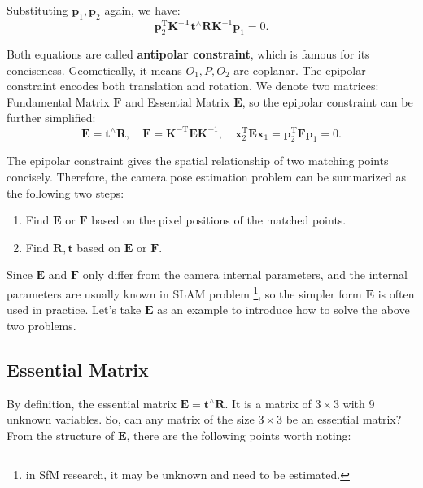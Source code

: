 Substituting $\bm{p}_1, \bm{p}_2$ again, we have:
\begin{equation}
\bm{p}_2^\mathrm{T} \bm{K}^{-\mathrm{T}} \bm{t}^\wedge \bm{R} \bm{K}^{-1} \bm{p}_1  = 0.
\end{equation}

Both equations are called \textbf{antipolar constraint}, which is famous for its conciseness. Geometically, it means $O_1, P, O_2$ are coplanar. The epipolar constraint encodes both translation and rotation. We denote two matrices: Fundamental Matrix $\bm{F}$ and Essential Matrix $\bm{E}$, so the epipolar constraint can be further simplified:
\begin{equation}
\bm{E} = \bm{t}^ \wedge \bm{R}, \quad \bm{F} = \bm{K}^{ -\mathrm{T}} \bm{E} {\bm{K}^{ - 1}}, \quad \bm{x}_2^\mathrm{T} \bm{E} {\bm{x}_1} = \bm{p}_2^\mathrm{T} \bm{F} {\bm{p}_1} = 0.
\end{equation}

The epipolar constraint gives the spatial relationship of two matching points concisely. Therefore, the camera pose estimation problem can be summarized as the following two steps:

\begin{enumerate}
	\item Find $\bm{E}$ or $\bm{F}$ based on the pixel positions of the matched points.
	\item Find $\bm{R}, \bm{t}$ based on $\bm{E}$ or $\bm{F}$.
\end{enumerate}

Since $\bm{E}$ and $\bm{F}$ only differ from the camera internal parameters, and the internal parameters are usually known in SLAM problem \footnote{ in SfM research, it may be unknown and need to be estimated. }, so the simpler form $\bm{E}$ is often used in practice. Let's take $\bm{E}$ as an example to introduce how to solve the above two problems.

\subsection{Essential Matrix}
By definition, the essential matrix $\bm{E} = \bm{t}^\wedge \bm{R}$. It is a matrix of $3\times 3$ with 9 unknown variables. So, can any matrix of the size $3 \times 3$ be an essential matrix? From the structure of $\bm{E}$, there are the following points worth noting:

